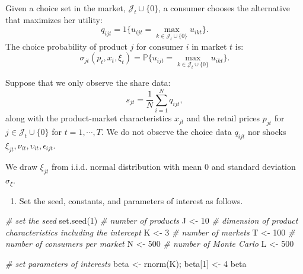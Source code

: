 \documentclass[
]{book}
\newenvironment{Shaded}{\begin{snugshade}}{\end{snugshade}}
\newcommand{\CommentTok}[1]{\textcolor[rgb]{0.56,0.35,0.01}{\textit{#1}}}
\newcommand{\DecValTok}[1]{\textcolor[rgb]{0.00,0.00,0.81}{#1}}
\newcommand{\FunctionTok}[1]{\textcolor[rgb]{0.00,0.00,0.00}{#1}}
\newcommand{\NormalTok}[1]{#1}
\newcommand{\OtherTok}[1]{\textcolor[rgb]{0.56,0.35,0.01}{#1}}
\providecommand{\tightlist}{%
  \setlength{\itemsep}{0pt}\setlength{\parskip}{0pt}}
\begin{document}
Given a choice set in the market, \(\mathcal{J}_t \cup \{0\}\), a consumer chooses the alternative that maximizes her utility:
\[
q_{ijt} = 1\{u_{ijt} = \max_{k \in \mathcal{J}_t \cup \{0\}} u_{ikt}\}.
\]
The choice probability of product \(j\) for consumer \(i\) in market \(t\) is:
\[
\sigma_{jt}(p_t, x_t, \xi_t) = \mathbb{P}\{u_{ijt} = \max_{k \in \mathcal{J}_t \cup \{0\}} u_{ikt}\}.
\]

Suppose that we only observe the share data:
\[
s_{jt} = \frac{1}{N} \sum_{i = 1}^N q_{ijt},
\]
along with the product-market characteristics \(x_{jt}\) and the retail prices \(p_{jt}\) for \(j \in \mathcal{J}_t \cup \{0\}\) for \(t = 1, \cdots, T\). We do not observe the choice data \(q_{ijt}\) nor shocks \(\xi_{jt}, \nu_{it}, \upsilon_{it}, \epsilon_{ijt}\).

We draw \(\xi_{jt}\) from i.i.d. normal distribution with mean 0 and standard deviation \(\sigma_{\xi}\).

\begin{enumerate}
\def\labelenumi{\arabic{enumi}.}
\tightlist
\item
  Set the seed, constants, and parameters of interest as follows.
\end{enumerate}

\begin{Shaded}
\begin{Highlighting}[]
\CommentTok{\# set the seed}
\FunctionTok{set.seed}\NormalTok{(}\DecValTok{1}\NormalTok{)}
\CommentTok{\# number of products}
\NormalTok{J }\OtherTok{\textless{}{-}} \DecValTok{10}
\CommentTok{\# dimension of product characteristics including the intercept}
\NormalTok{K }\OtherTok{\textless{}{-}} \DecValTok{3}
\CommentTok{\# number of markets}
\NormalTok{T }\OtherTok{\textless{}{-}} \DecValTok{100}
\CommentTok{\# number of consumers per market}
\NormalTok{N }\OtherTok{\textless{}{-}} \DecValTok{500}
\CommentTok{\# number of Monte Carlo}
\NormalTok{L }\OtherTok{\textless{}{-}} \DecValTok{500}
\end{Highlighting}
\end{Shaded}

\begin{Shaded}
\begin{Highlighting}[]
\CommentTok{\# set parameters of interests}
\NormalTok{beta }\OtherTok{\textless{}{-}} \FunctionTok{rnorm}\NormalTok{(K); }
\NormalTok{beta[}\DecValTok{1}\NormalTok{] }\OtherTok{\textless{}{-}} \DecValTok{4}
\NormalTok{beta}
\end{Highlighting}
\end{Shaded}
\end{document}
